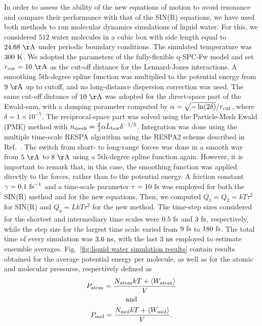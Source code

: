 \documentclass[
aip,
jcp,
reprint,
]{revtex4-1}
\begin{document}
In order to assess the ability of the new equations of motion to avoid resonance and compare their performance with that of the SIN(R) equations, we have used both methods to run molecular dynamics simulations of liquid water.
For this, we considered $512$ water molecules in a cubic box with side length equal to $24.68~{\rm \AA}$ under periodic boundary conditions.
The simulated temperature was $300~{\rm K}$.
We adopted the parameters of the fully-flexible q-SPC-Fw model \cite{Paesani_2006} and set $r_{\rm cut} = 10~{\rm \AA}$ as the cut-off distance for the Lennard-Jones interactions.
A smoothing 5th-degree spline function was multiplied to the potential energy from $9~{\rm \AA}$ up to cutoff, and no long-distance dispersion correction was used.
The same cut-off distance of $10~{\rm \AA}$ was adopted for the direct-space part of the Ewald-sum, with a damping parameter computed by $\alpha = {\sqrt{-\ln(2\delta)}}/{r_{\rm cut}}$, where $\delta = 1\times10^{-5}$.
The reciprocal-space part was solved using the Particle-Mesh Ewald (PME) method with $n_{\rm mesh} = \frac{2}{3} \alpha L_{\rm box} \delta^{-1/5}$.
Integration was done using the multiple time-scale RESPA algorithm using the RESPA2 scheme described in Ref.~.
The switch from short- to long-range forces was done in a smooth way from $5~{\rm \AA}$ to $8~{\rm \AA}$ using a 5th-degree spline function again.
However, it is important to remark that, in this case, the smoothing function was applied directly to the forces, rather than to the potential energy.
A friction constant $\gamma = 0.1~{\rm fs}^{-1}$ and a time-scale parameter $\tau = 10~{\rm fs}$ was employed for both the SIN(R) method and for the new equations.
Then, we computed $Q_1 = Q_2 = kT \tau^2$ for SIN(R) and $Q_\eta = L kT \tau^2$ for the new method.
The time-step sizes considered for the shortest and intermediary time scales were $0.5~{\rm fs}$ and $3~{\rm fs}$, respectively, while the step size for the largest time scale varied from $9~{\rm fs}$ to $180~{\rm fs}$.
The total time of every simulation was $3.6~{\rm ns}$, with the last $3~{\rm ns}$ employed to estimate ensemble averages.
Fig.~\ref{fig:liquid water simulation results} contain results obtained for the average potential energy per molecule, as well as for the atomic and  molecular pressures, respectively defined as
\begin{multline}
P_{\rm atom} = \frac{N_{\rm atom} kT + \langle W_{\rm atom} \rangle}{V}
\\ {\rm and} \\
P_{\rm mol} = \frac{N_{\rm mol} kT + \langle W_{\rm mol} \rangle}{V}.
\end{multline}
\end{document}
